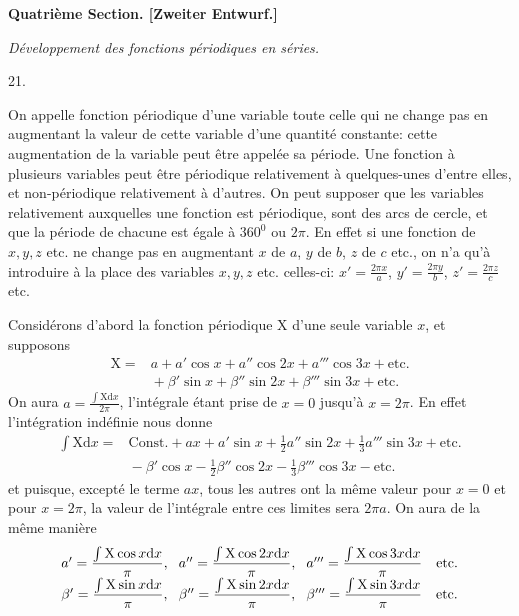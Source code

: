 \par{}\bigskip
{}
\begin{center}{\large\bfseries Quatrième Section. [Zweiter Entwurf.]\par}\medskip
\textit{Développement des fonctions périodiques en séries.}\end{center}
\begin{center}21.\end{center}
\begingroup
\noindent\hspace*{\parindent}On appelle fonction périodique d’une variable toute celle qui ne change pas en augmentant la valeur de cette variable d’une quantité constante: cette augmentation de la variable peut être appelée sa période. Une fonction à plusieurs variables peut être périodique relativement à quelques-unes d’entre elles, et non-périodique relativement à d’autres. On peut supposer que les variables relativement auxquelles une fonction est périodique, sont des arcs de cercle, et que la période de chacune est égale à \(360^0\) ou \(2\pi\). En effet si une fonction de \(x,y,z\) etc. ne change pas en augmentant \(x\) de \(a\), \(y\) de \(b\), \(z\) de \(c\) etc., on n’a qu’à introduire à la place des variables \(x,y,z\) etc. celles-ci: \(x'=\frac{2\pi x}{a}\), \(y'=\frac{2\pi y}{b}\), \(z'=\frac{2\pi z}{c}\) etc.
\par
Considérons d’abord la fonction périodique \(\mathrm{X}\) d’une seule variable \(x\), et supposons
\[
\begin{aligned}
\mathrm{X}={}&a+a'\cos x+a''\cos2x+a'''\cos3x+\text{etc.}\\
&{}+\beta'\sin x+\beta''\sin2x+\beta'''\sin3x+\text{etc.}
\end{aligned}
\]
\noindent{}On aura \(a=\frac{\int\mathrm{X}\mathrm{d}x}{2\pi}\), l’intégrale étant prise de \(x=0\) jusqu’à \(x=2\pi\). En effet l’intégration indéfinie nous donne
\[
\begin{aligned}
\int\mathrm{X}\mathrm{d}x={}&\text{Const.}+ax+a'\sin x+\tfrac12a''\sin2x+\tfrac13a'''\sin3x+\text{etc.}\\
&{}-\beta'\cos x-\tfrac12\beta''\cos2x-\tfrac13\beta'''\cos3x-\text{etc.}
\end{aligned}
\]
\noindent et puisque, excepté le terme \(ax\), tous les autres ont la même valeur pour \(x=0\) et pour \(x=2\pi\), la valeur de l’intégrale entre ces limites sera \(2\pi a\). On aura de la même manière
\[
\setlength{\arraycolsep}{4pt}
\begin{array}{lll}
a'=\dfrac{\int\mathrm{X}\cos x\mathrm{d}x}{\pi},&a''=\dfrac{\int\mathrm{X}\cos2x\mathrm{d}x}{\pi},&a'''=\dfrac{\int\mathrm{X}\cos3x\mathrm{d}x}{\pi}\quad\text{etc.}\\[4pt]
\beta'=\dfrac{\int\mathrm{X}\sin x\mathrm{d}x}{\pi},&\beta''=\dfrac{\int\mathrm{X}\sin2x\mathrm{d}x}{\pi},&\beta'''=\dfrac{\int\mathrm{X}\sin3x\mathrm{d}x}{\pi}\quad\text{etc.}
\end{array}
\]
\par\endgroup
